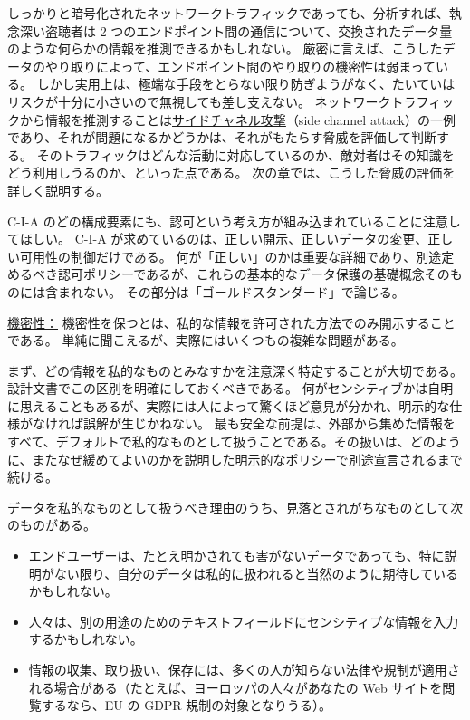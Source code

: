 \documentclass[uplatex]{jsarticle}
\def\label#1{}%
\begin{document}
\begin{exa}[暗号化された通信からの推測]\label{exa:ch1-encrypted-traffic}
しっかりと暗号化されたネットワークトラフィックであっても、分析すれば、執念深い盗聴者は 2 つのエンドポイント間の通信について、交換されたデータ量のような何らかの情報を推測できるかもしれない。
厳密に言えば、こうしたデータのやり取りによって、エンドポイント間のやり取りの機密性は弱まっている。
しかし実用上は、極端な手段をとらない限り防ぎようがなく、たいていはリスクが十分に小さいので無視しても差し支えない。
ネットワークトラフィックから情報を推測することは\underline{サイドチャネル攻撃}（side channel attack）の一例であり、それが問題になるかどうかは、それがもたらす脅威を評価して判断する。
そのトラフィックはどんな活動に対応しているのか、敵対者はその知識をどう利用しうるのか、といった点である。
次の章では、こうした脅威の評価を詳しく説明する。
\end{exa}

C-I-A のどの構成要素にも、認可という考え方が組み込まれていることに注意してほしい。
C-I-A が求めているのは、正しい開示、正しいデータの変更、正しい可用性の制御だけである。
何が「正しい」のかは重要な詳細であり、別途定めるべき認可ポリシーであるが、これらの基本的なデータ保護の基礎概念そのものには含まれない。
その部分は「ゴールドスタンダード」で論じる。

\underline{機密性：}
機密性を保つとは、私的な情報を許可された方法でのみ開示することである。
単純に聞こえるが、実際にはいくつもの複雑な問題がある。

まず、どの情報を私的なものとみなすかを注意深く特定することが大切である。
設計文書でこの区別を明確にしておくべきである。
何がセンシティブかは自明に思えることもあるが、実際には人によって驚くほど意見が分かれ、明示的な仕様がなければ誤解が生じかねない。
最も安全な前提は、外部から集めた情報をすべて、デフォルトで私的なものとして扱うことである。その扱いは、どのように、またなぜ緩めてよいのかを説明した明示的なポリシーで別途宣言されるまで続ける。

データを私的なものとして扱うべき理由のうち、見落とされがちなものとして次のものがある。
\begin{itemize}
\item エンドユーザーは、たとえ明かされても害がないデータであっても、特に説明がない限り、自分のデータは私的に扱われると当然のように期待しているかもしれない。
\item 人々は、別の用途のためのテキストフィールドにセンシティブな情報を入力するかもしれない。
\item 情報の収集、取り扱い、保存には、多くの人が知らない法律や規制が適用される場合がある（たとえば、ヨーロッパの人々があなたの Web サイトを閲覧するなら、EU の GDPR 規制の対象となりうる）。
\end{itemize}
\end{document}
